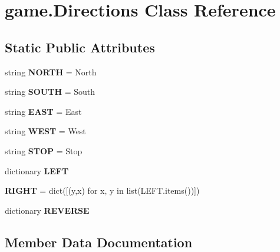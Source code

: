 \hypertarget{classgame_1_1_directions}{}\section{game.\+Directions Class Reference}
\label{classgame_1_1_directions}
\subsection*{Static Public Attributes}
\begin{DoxyCompactItemize}
\item 
\mbox{\label{classgame_1_1_directions_a1fff6a8a68dbe00f087721d5baceae5c}} 
string {\bfseries N\+O\+R\+TH} = \textquotesingle{}North\textquotesingle{}
\item 
\mbox{\label{classgame_1_1_directions_ae5858669bbb5df1decffc5607937a2fa}} 
string {\bfseries S\+O\+U\+TH} = \textquotesingle{}South\textquotesingle{}
\item 
\mbox{\label{classgame_1_1_directions_ae57293958ef150fea46fcbf5b895972b}} 
string {\bfseries E\+A\+ST} = \textquotesingle{}East\textquotesingle{}
\item 
\mbox{\label{classgame_1_1_directions_a65ff55da10c03aa93e469ef4d7464994}} 
string {\bfseries W\+E\+ST} = \textquotesingle{}West\textquotesingle{}
\item 
\mbox{\label{classgame_1_1_directions_aadd50b4011221fe87cc99c16ecf3c2b2}} 
string {\bfseries S\+T\+OP} = \textquotesingle{}Stop\textquotesingle{}
\item 
dictionary {\bfseries L\+E\+FT}
\item 
\mbox{\label{classgame_1_1_directions_a2e9fca42b9c0e302aaf712fe3d3ad5be}} 
{\bfseries R\+I\+G\+HT} = dict(\mbox{[}(y,x) for x, y in list(L\+E\+F\+T.\+items())\mbox{]})
\item 
dictionary {\bfseries R\+E\+V\+E\+R\+SE}
\end{DoxyCompactItemize}


\subsection{Member Data Documentation}
\mbox{\label{classgame_1_1_directions_a862c07c3211023e93b5eadfecabe1957}} 
